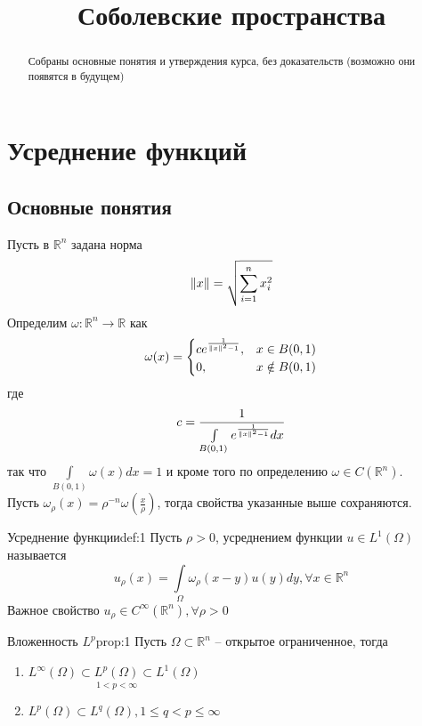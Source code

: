 \documentclass[12pt,a4paper]{article}
\title{Соболевские пространства}
\newcommand{\intset}[1]{\int\limits_{#1}}
\newcommand{\Real}{\mathbb{R}}
\begin{document}
	
\maketitle
\begin{abstract}
	Собраны основные понятия и утверждения курса, без доказательств (возможно они появятся в будущем)
\end{abstract}

\section{Усреднение функций}
	
\subsection{Основные понятия}

Пусть в $\Real^n$ задана норма 
$$\norm{x} = \sqrt{\sum_{i=1}^{n}{x_i^2}}$$ 
Определим $\omega: \Real^n \to \Real$ как
\begin{equation*}
	\omega (x) = 
		\begin{cases}
		c e^{\frac{1}{\norm{x}^2 - 1}}, & x \in B(0, 1) \\
		0, & x \notin B(0, 1)
		\end{cases}
\end{equation*}
где 
$$c  = \frac{1}{\intset{B(0,1)}{e^{\frac{1}{\norm{x}^2 - 1}}dx}}$$
так что $\intset{B(0,1)}{\omega(x)dx} = 1$ и кроме того по определению $\omega \in C(\Real^n)$. \\ Пусть $\omega_\rho (x) = \rho^{-n} \omega \left(\frac{x}{\rho}\right)$, тогда свойства указанные выше сохраняются.

\begin{definition}{Усреднение функции}{def:1}
	Пусть $\rho > 0$, усреднением функции $u \in L^{1}(\Omega)$ называется 
	$$u_\rho (x) = \intset{\Omega}{\omega_\rho (x - y) u(y) dy}, \forall x \in \Real^n$$
	Важное свойство $u_\rho \in C^{\infty}(\Real^n), \forall \rho > 0$
\end{definition}

\begin{proposition}{Вложенность $L^p$}{prop:1}
	Пусть $\Omega \subset \Real^n$ -- открытое ограниченное, тогда
	\begin{enumerate}
		\item $L^{\infty}(\Omega) \subset \underset{1 < p < \infty}{L^{p}(\Omega)} \subset L^{1}(\Omega)$
		\item $L^{p}(\Omega) \subset L^{q}(\Omega), 1 \leq q < p \leq \infty$
	\end{enumerate}
\end{proposition}
\end{document}
